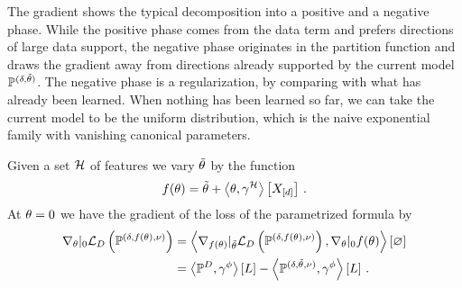 

The gradient shows the typical decomposition into a positive and a negative phase.
While the positive phase comes from the data term and prefers directions of large data support, the negative phase originates in the partition function and draws the gradient away from directions already supported by the current model $\mathbb{P}^{(\delta, \tilde{\theta})}$.
The negative phase is a regularization, by comparing with what has already been learned.
When nothing has been learned so far, we can take the current model to be the uniform distribution, which is the naive exponential family with vanishing canonical parameters. 



Given a set $\mathcal{H}$ of features we vary $\tilde{\theta}$ by the function
\begin{align*}
	 f(\theta) = \tilde{\theta} + \left\langle \theta,\gamma^{\mathcal{H}}\right\rangle \left[ X_{[d]} \right] \, . 
\end{align*}
At $\theta=0$ we have the gradient of the loss of the parametrized formula by
\begin{align*}
	 \nabla_{\theta}|_{0} 
	 \mathcal{L}_{D}\left(\mathbb{P}^{(\delta,f(\theta),\nu)}\right)
	 &= \left\langle 
	 	 \nabla_{f(\theta)}|_{\tilde{\theta}}  \mathcal{L}_{D}\left(\mathbb{P}^{(\delta,f(\theta),\nu)}\right),
		 \nabla_{\theta}|_{0}  f(\theta)
	 \right\rangle \left[ \varnothing \right]  \\
	 &= \left\langle \mathbb{P}^{D},\gamma^{\phi}\right\rangle \left[ L \right] -   \left\langle \mathbb{P}^{(\delta, \tilde{\theta}, \nu)},\gamma^{\phi}\right\rangle \left[ L \right] \, . 
\end{align*}



